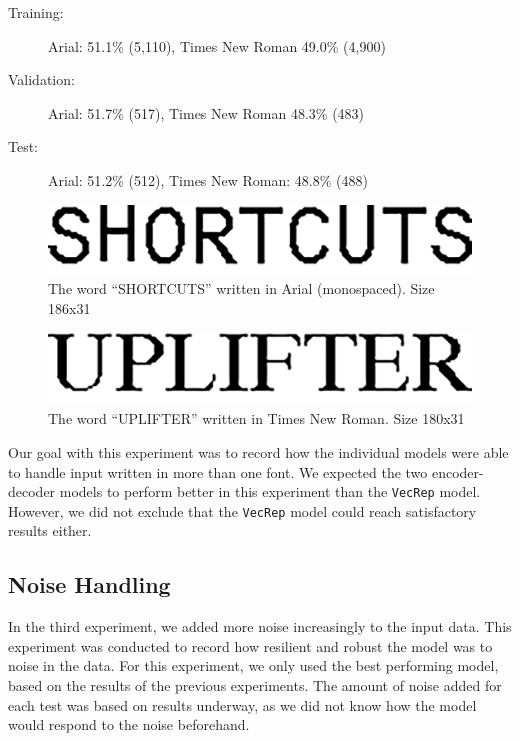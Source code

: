 \vspace{0.5cm}
\begin{minipage}{0.8\linewidth}
    \begin{description}
        \item[Training:]{Arial: 51.1\% (5,110), Times New Roman 49.0\% (4,900)}
        \item[Validation:]{Arial: 51.7\% (517), Times New Roman 48.3\% (483)}
        \item[Test:]{Arial: 51.2\% (512), Times New Roman: 48.8\% (488)}
    \end{description}
\end{minipage}

\begin{figure}[ht]
    \centering
    \captionsetup{justification=centering}
    \includegraphics[width=1\textwidth]{fig/experiments/SHORTCUTS_dpi.png}
    \caption{The word ``SHORTCUTS'' written in Arial (monospaced). Size 186x31}
\end{figure}

\begin{figure}[ht]
    \centering
    \captionsetup{justification=centering}
    \includegraphics[width=1\textwidth]{fig/experiments/UPLIFTER_dpi.png}
    \caption{The word ``UPLIFTER'' written in Times New Roman. Size 180x31}
\end{figure}

Our goal with this experiment was to record how the individual models were able to handle input written in more than one font. We expected the two encoder-decoder models to perform better in this experiment than the {\tt VecRep} model. However, we did not exclude that the {\tt VecRep} model could reach satisfactory results either.

\subsection{Noise Handling}
In the third experiment, we added more noise increasingly to the input data. This experiment was conducted to record how resilient and robust the model was to noise in the data. For this experiment, we only used the best performing model, based on the results of the previous experiments. The amount of noise added for each test was based on results underway, as we did not know how the model would respond to the noise beforehand.

